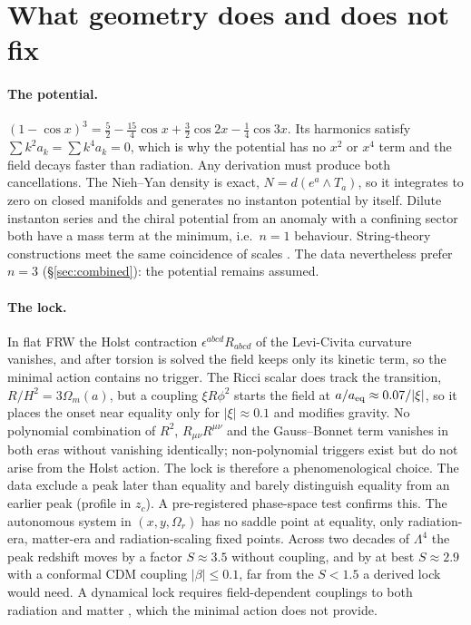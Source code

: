 \documentclass[11pt]{article}
\begin{document}
\section{What geometry does and does not fix}\label{sec:derive}
\paragraph{The potential.} $(1-\cos x)^3=\tfrac52-\tfrac{15}{4}\cos x+\tfrac32\cos2x-\tfrac14\cos3x$. Its harmonics
satisfy $\sum k^2a_k=\sum k^4a_k=0$, which is why the potential has no $x^2$ or $x^4$ term and the field decays faster
than radiation. Any derivation must produce both cancellations. The Nieh--Yan density is exact,
$N=d(e^a\wedge T_a)$, so it integrates to zero on closed manifolds and generates no instanton potential by itself.
Dilute instanton series and the chiral potential from an anomaly with a confining sector both have a mass term
at the minimum, i.e.\ $n=1$ behaviour. String-theory constructions meet the same coincidence of scales
\cite{mcdonough2022}. The data nevertheless prefer $n=3$ (\S\ref{sec:combined}): the potential remains assumed.

\paragraph{The lock.} In flat FRW the Holst contraction $\epsilon^{abcd}R_{abcd}$ of the Levi-Civita curvature
vanishes, and after torsion is solved the field keeps only its kinetic term, so the minimal action contains no
trigger. The Ricci scalar does track the transition, $R/H^2=3\Omega_m(a)$, but a coupling $\xi R\phi^2$ starts
the field at $a/a_{\rm eq}\approx0.07/|\xi|$, so it places the onset near equality only for $|\xi|\approx0.1$ and
modifies gravity. No polynomial combination of $R^2$, $R_{\mu\nu}R^{\mu\nu}$ and the Gauss--Bonnet term vanishes in
both eras without vanishing identically; non-polynomial triggers exist \cite{jing2024} but do not arise from the
Holst action. The lock is therefore a phenomenological choice. The data exclude a peak later than equality and
barely distinguish equality from an earlier peak (profile in $z_c$). A pre-registered phase-space test confirms this.
The autonomous system in $(x,y,\Omega_r)$ has no saddle point at equality, only radiation-era, matter-era and
radiation-scaling fixed points. Across two decades of $\Lambda^4$ the peak redshift moves by a factor $S\approx3.5$
without coupling, and by at best $S\approx2.9$ with a conformal CDM coupling $|\beta|\le0.1$, far from the $S<1.5$ a
derived lock would need. A dynamical lock requires field-dependent couplings to both radiation and matter
\cite{ramadan2023}, which the minimal action does not provide.
\end{document}
